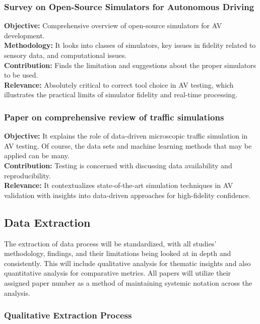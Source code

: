 \documentclass[lettersize,journal]{IEEEtran}
\begin{document}
\subsubsection{Survey on Open-Source Simulators for Autonomous Driving}\cite{ref49}
\textbf{Objective:} Comprehensive overview of open-source simulators for AV development. \\
\textbf{Methodology:} It looks into classes of simulators, key issues in fidelity related to sensory data, and computational issues. \\
\textbf{Contribution:} Finds the limitation and suggestions about the proper simulators to be used. \\
\textbf{Relevance:} Absolutely critical to correct tool choice in AV testing, which illustrates the practical limits of simulator fidelity and real-time processing.

\subsubsection{Paper on comprehensive review of traffic simulations}\cite{ref50}
\textbf{Objective:} It explains the role of data-driven microscopic traffic simulation in AV testing. Of course, the data sets and machine learning methods that may be applied can be many. \\
\textbf{Contribution:} Testing is concerned with discussing data availability and reproducibility. \\
\textbf{Relevance:} It contextualizes state-of-the-art simulation techniques in AV validation with insights into data-driven approaches for high-fidelity confidence.

\subsection{Data Extraction}

The extraction of data process will be standardized, with all studies' methodology, findings, and their limitations being looked at in depth and consistently. This will include qualitative analysis for thematic insights and also quantitative analysis for comparative metrics. All papers will utilize their assigned paper number as a method of maintaining systemic notation across the analysis.

\subsubsection{Qualitative Extraction Process}
\end{document}
